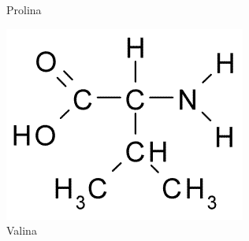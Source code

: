 \documentclass[a4paper,12pt]{article}
\begin{document}
\begin{figure}[H]
\begin{center}
\begin{minipage}{0.24\linewidth}
 				\caption{Prolina}
 				\label{fig:proline}
 			\end{minipage}
	 		\begin{minipage}{0.24\linewidth}
		 		\centering   
		 		\includegraphics[width=0.8\linewidth]{valine.png}
		 		\caption{Valina}
		 		\label{fig:valine}
		 	\end{minipage}
 		\end{center}
 	\end{figure}
 	\vspace{-1cm}
\end{document}
